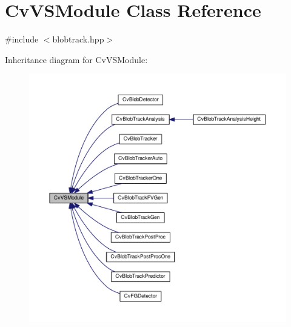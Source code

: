 \hypertarget{classCvVSModule}{\section{Cv\-V\-S\-Module Class Reference}
\label{classCvVSModule}
}


{\ttfamily \#include $<$blobtrack.\-hpp$>$}



Inheritance diagram for Cv\-V\-S\-Module\-:\nopagebreak
\begin{figure}[H]
\begin{center}
\leavevmode
\includegraphics[width=350pt]{classCvVSModule__inherit__graph}
\end{center}
\end{figure}
